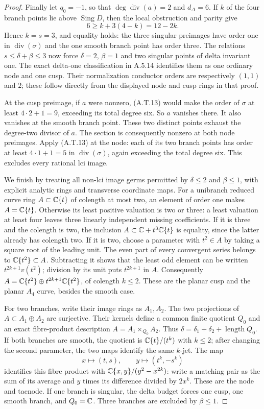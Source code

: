 \begin{proof}
Finally let $q_0=-1$, so that $\deg\operatorname{div}(a)=2$
and $d_\Delta=6$. If $k$ of the four branch points
lie above $\operatorname{Sing}D$, then the local
obstruction and parity give
\[
               6\ge k+3(4-k)=12-2k.
\]
Hence $k=s=3$, and equality holds: the three singular
preimages have order one in $\operatorname{div}(\sigma)$
and the one smooth branch point has order three.
The relations $s\le\delta+\beta\le3$ now force
$\delta=2$, $\beta=1$ and two singular points of
delta invariant one. The exact delta-one
classification in A.5.14 identifies them as one
ordinary node and one cusp. Their normalization
conductor orders are respectively $(1,1)$ and $2$;
these follow directly from the displayed node and
cusp rings in that proof.

At the cusp preimage, if $a$ were nonzero,
(A.T.13) would make the order of $\sigma$ at least
$4\cdot2+1=9$, exceeding its total degree six.
So $a$ vanishes there. It also vanishes at the
smooth branch point. These two distinct points
exhaust the degree-two divisor of $a$. The section
is consequently nonzero at both node preimages.
Apply (A.T.13) at the node: each of its two branch
points has order at least $4\cdot1+1=5$ in
$\operatorname{div}(\sigma)$, again exceeding the
total degree six. This excludes every rational lci image.

We finish by treating all non-lci image germs permitted
by $\delta\le2$ and $\beta\le1$, with explicit analytic
rings and transverse coordinate maps. For a unibranch
reduced curve ring $A\subset\mathbb C\{t\}$ of colength at
most two, an element of order one makes $A=\mathbb C\{t\}$.
Otherwise its least positive valuation is two or three:
a least valuation at least four leaves three linearly
independent missing coefficients. If it is three and
the colength is two, the inclusion
$A\subset\mathbb C+t^3\mathbb C\{t\}$ is equality, since the latter
already has colength two. If it is two, choose a
parameter with $t^2\in A$ by taking a square root of
the leading unit. The even part of every convergent
series belongs to $\mathbb C\{t^2\}\subset A$. Subtracting
it shows that the least odd element can be written
$t^{2k+1}v(t^2)$; division by its unit puts
$t^{2k+1}$ in $A$. Consequently
$A=\mathbb C\{t^2\}\oplus t^{2k+1}\mathbb C\{t^2\}$, of colength
$k\le2$. These are the planar cusp and the planar
$A_4$ curve, besides the smooth case.

For two branches, write their image rings as $A_1,A_2$.
The two projections of $A\subset A_1\oplus A_2$ are
surjective. Their kernels define a common finite
quotient $Q_0$ and an exact fibre-product description
$A=A_1\times_{Q_0}A_2$. Thus
$\delta=\delta_1+\delta_2+\operatorname{length}Q_0$.
If both branches are smooth, the quotient is
$\mathbb C\{t\}/(t^k)$ with $k\le2$; after changing the
second parameter, the two maps identify the same
$k$-jet. The map
\[
 x\longmapsto(t,s),\qquad
 y\longmapsto(t^k,-s^k)
\]
identifies this fibre product with
$\mathbb C\{x,y\}/(y^2-x^{2k})$: write a matching pair as
the sum of its average and $y$ times its difference
divided by $2x^k$. These are the node and tacnode.
If one branch is singular, the delta budget forces
one cusp, one smooth branch, and $Q_0=\mathbb C$.
Three branches are excluded by $\beta\le1$.


\end{proof}
